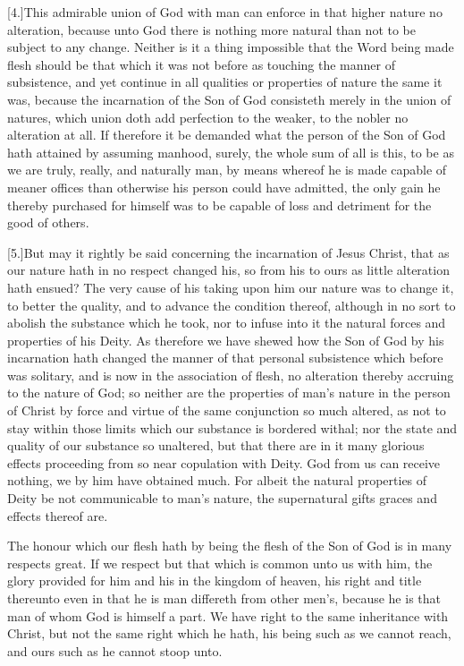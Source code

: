 [4.]This admirable union of God with man can enforce in that higher nature no alteration, because unto God there is nothing more natural than not to be subject to any change. Neither is it a thing impossible that the Word being made flesh should be that which it was not before as touching the manner of subsistence, and yet continue in all qualities or properties of nature the same it was, because the incarnation of the Son of God consisteth merely in the union of natures, which union doth add perfection to the weaker, to the nobler no alteration at all. If therefore it be demanded what the person of the Son of God hath attained by assuming manhood, surely, the whole sum of all is this, to be as we are truly, really, and naturally man, by means whereof he is made capable of meaner offices than otherwise his person could have admitted, the only gain he thereby purchased for himself was to be capable of loss and detriment for the good of others.

[5.]But may it rightly be said concerning the incarnation of Jesus Christ, that as our nature hath in no respect changed his, so from his to ours as little alteration hath ensued? The very cause of his taking upon him our nature was to change it, to better the quality, and to advance the condition thereof, although in no sort to abolish the substance which he took, nor to infuse into it the natural forces and properties of his Deity. As therefore we have shewed how the Son of God by his incarnation hath changed the manner of that personal subsistence which before was solitary, and is now in the association of flesh, no alteration thereby accruing to the nature of God; so neither are the properties of man’s nature in the person of Christ by force and virtue of the same conjunction so much altered, as not to stay within those limits which our substance is bordered withal; nor the state and quality of our substance so unaltered, but that there are in it many glorious effects  proceeding from so near copulation with Deity.
 God from us can receive nothing, we by him have obtained much. For albeit the natural properties of Deity be not communicable to man’s nature, the supernatural gifts graces and effects thereof are.

The honour which our flesh hath by being the flesh of the Son of God is in many respects great. If we respect but that which is common unto us with him, the glory provided for him and his in the kingdom of heaven, his right and title thereunto even in that he is man differeth from other men’s, because he is that man of whom God is himself a part. We have right to the same inheritance with Christ, but not the same right which he hath, his being such as we cannot reach, and ours such as he cannot stoop unto.


